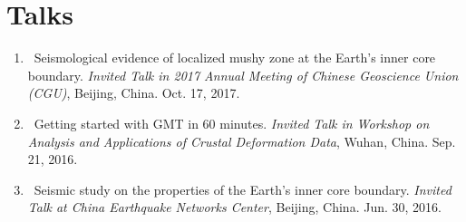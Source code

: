 \section*{Talks}
\begin{enumerate}
\item
    \Tian\
    Seismological evidence of localized mushy zone at the Earth's inner core boundary.
    \textit{Invited Talk in 2017 Annual Meeting of Chinese Geoscience Union (CGU)}, Beijing, China.
    Oct. 17, 2017.
\item
    \Tian\
    Getting started with GMT in 60 minutes.
    \textit{Invited Talk in Workshop on Analysis and Applications of Crustal Deformation Data}, Wuhan, China.
    Sep. 21, 2016.
\item
    \Tian\
    Seismic study on the properties of the Earth's inner core boundary.
    \textit{Invited Talk at China Earthquake Networks Center}, Beijing, China.
    Jun. 30, 2016.
\end{enumerate}
